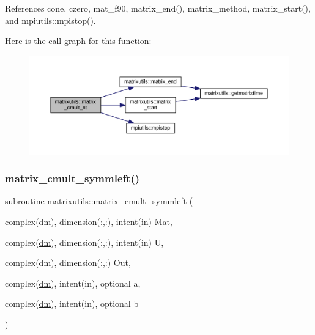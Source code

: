 References cone, czero, mat\+\_\+f90, matrix\+\_\+end(), matrix\+\_\+method, matrix\+\_\+start(), and mpiutils\+::mpistop().

Here is the call graph for this function\+:
\nopagebreak
\begin{figure}[H]
\begin{center}
\leavevmode
\includegraphics[width=350pt]{namespacematrixutils_afdb73dd3fe4ce57e9ba27e6d3d511376_cgraph}
\end{center}
\end{figure}
\mbox{\label{namespacematrixutils_a4389445ac98a45384153fff75a6a21af}} 
\subsubsection{\texorpdfstring{matrix\+\_\+cmult\+\_\+symmleft()}{matrix\_cmult\_symmleft()}}
{\footnotesize\ttfamily subroutine matrixutils\+::matrix\+\_\+cmult\+\_\+symmleft (\begin{DoxyParamCaption}\item[{complex(\mbox{\hyperlink{namespacematrixutils_a7bdc564986ea4d90f51201c75606ef3d}{dm}}), dimension(\+:,\+:), intent(in)}]{Mat,  }\item[{complex(\mbox{\hyperlink{namespacematrixutils_a7bdc564986ea4d90f51201c75606ef3d}{dm}}), dimension(\+:,\+:), intent(in)}]{U,  }\item[{complex(\mbox{\hyperlink{namespacematrixutils_a7bdc564986ea4d90f51201c75606ef3d}{dm}}), dimension(\+:,\+:)}]{Out,  }\item[{complex(\mbox{\hyperlink{namespacematrixutils_a7bdc564986ea4d90f51201c75606ef3d}{dm}}), intent(in), optional}]{a,  }\item[{complex(\mbox{\hyperlink{namespacematrixutils_a7bdc564986ea4d90f51201c75606ef3d}{dm}}), intent(in), optional}]{b }\end{DoxyParamCaption})}



